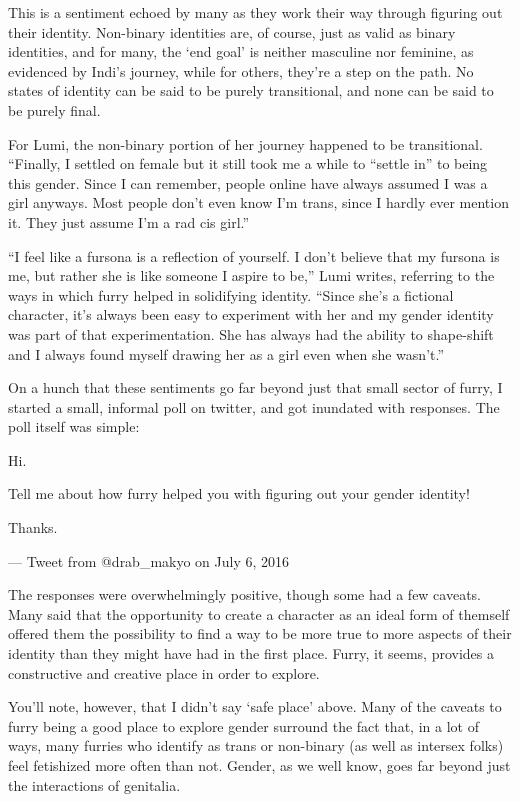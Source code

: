 This is a sentiment echoed by many as they work their way through figuring out their identity. Non-binary identities are, of course, just as valid as binary identities, and for many, the `end goal' is neither masculine nor feminine, as evidenced by Indi's journey, while for others, they're a step on the path. No states of identity can be said to be purely transitional, and none can be said to be purely final.

For Lumi, the non-binary portion of her journey happened to be transitional. ``Finally, I settled on female but it still took me a while to ``settle in'' to being this gender. Since I can remember, people online have always assumed I was a girl anyways. Most people don't even know I'm trans, since I hardly ever mention it. They just assume I'm a rad cis girl.''

``I feel like a fursona is a reflection of yourself. I don't believe that my fursona is me, but rather she is like someone I aspire to be,'' Lumi writes, referring to the ways in which furry helped in solidifying identity. ``Since she's a fictional character, it's always been easy to experiment with her and my gender identity was part of that experimentation. She has always had the ability to shape-shift and I always found myself drawing her as a girl even when she wasn't.''

On a hunch that these sentiments go far beyond just that small sector of furry, I started a small, informal poll on twitter, and got inundated with responses. The poll itself was simple:

Hi.

Tell me about how furry helped you with figuring out your gender identity!

Thanks.

--- Tweet from @drab\_makyo on July 6, 2016

The responses were overwhelmingly positive, though some had a few caveats. Many said that the opportunity to create a character as an ideal form of themself offered them the possibility to find a way to be more true to more aspects of their identity than they might have had in the first place. Furry, it seems, provides a constructive and creative place in order to explore.

You'll note, however, that I didn't say `safe place' above. Many of the caveats to furry being a good place to explore gender surround the fact that, in a lot of ways, many furries who identify as trans or non-binary (as well as intersex folks) feel fetishized more often than not. Gender, as we well know, goes far beyond just the interactions of genitalia.

